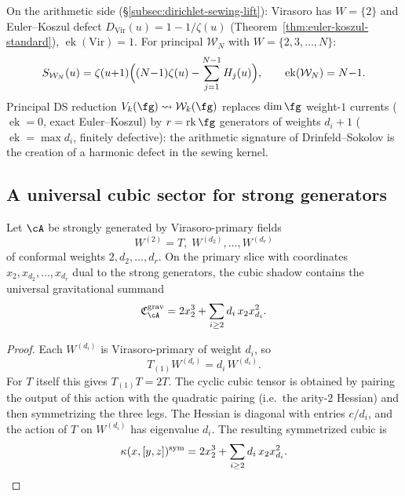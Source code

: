 On the arithmetic side
(\S\ref{subsec:dirichlet-sewing-lift}): Virasoro has
$W = \{2\}$ and Euler--Koszul defect
$D_{\mathrm{Vir}}(u) = 1 - 1/\zeta(u)$
(Theorem~\ref{thm:euler-koszul-standard}),
$\operatorname{ek}(\mathrm{Vir}) = 1$.
For principal $\mathcal{W}_N$ with
$W = \{2, 3, \ldots, N\}$:
\[
S_{\mathcal{W}_N}(u)
= \zeta(u{+}1)\Bigl(
(N{-}1)\zeta(u) - \sum_{j=1}^{N-1}H_j(u)
\Bigr),
\qquad
\operatorname{ek}(\mathcal{W}_N) = N{-}1.
\]
Principal DS reduction $V_k(\fg) \leadsto \mathcal{W}_k(\fg)$
replaces $\dim\fg$ weight-$1$ currents
($\operatorname{ek} = 0$, exact Euler--Koszul)
by $r = \operatorname{rk}\fg$ generators of weights $d_i + 1$
($\operatorname{ek} = \max d_i$, finitely defective):
the arithmetic signature of Drinfeld--Sokolov
is the creation of a harmonic defect in the sewing kernel.

\subsection{A universal cubic sector for strong generators}
\label{subsec:w-universal-cubic-sector}

\begin{theorem}
\label{thm:w-universal-gravitational-cubic}
Let $\cA$ be strongly generated by Virasoro-primary fields
\[
W^{(2)}=T,\;W^{(d_2)},\dots,W^{(d_r)}
\]
of conformal weights $2,d_2,\dots,d_r$.  On the primary slice with
coordinates $x_2,x_{d_2},\dots,x_{d_r}$ dual to the strong generators,
the cubic shadow contains the universal gravitational summand
\begin{equation}
\label{eq:w-universal-gravitational-cubic}
\mathfrak C^{\mathrm{grav}}_{\cA}
=
2x_2^3+\sum_{i\ge 2} d_i\,x_2x_{d_i}^2.
\end{equation}
\end{theorem}

\begin{proof}
Each $W^{(d_i)}$ is Virasoro-primary of weight $d_i$, so
\[
T_{(1)}W^{(d_i)}=d_i\,W^{(d_i)}.
\]
For $T$ itself this gives $T_{(1)}T=2T$.  The cyclic cubic tensor is
obtained by pairing the output of this action with the quadratic
pairing (i.e.\ the arity-$2$ Hessian) and then symmetrizing the
three legs.  The Hessian is diagonal with entries $c/d_i$, and the
action of $T$ on $W^{(d_i)}$ has eigenvalue $d_i$.  The resulting
symmetrized cubic is
\[
\kappa(x,[y,z])^{\mathrm{sym}}
=
2x_2^3+\sum_{i\ge 2} d_i\,x_2x_{d_i}^2. \qedhere
\]
\end{proof}

